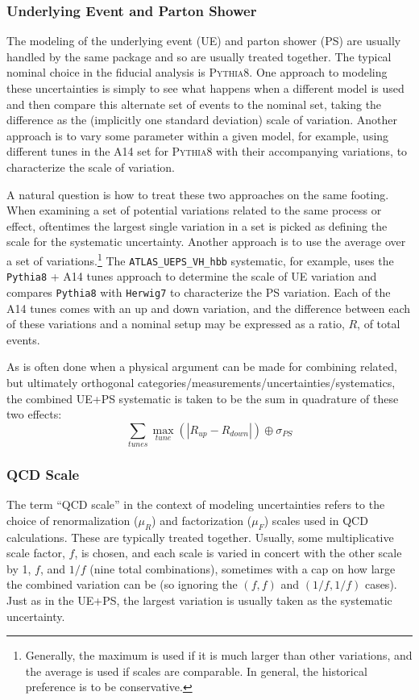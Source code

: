 \subsubsection{Underlying Event and Parton Shower}
\label{sec:ueps}
The modeling of the underlying event (UE) and parton shower (PS) are usually handled by the same package and so are usually treated together.  The typical nominal choice in the fiducial analysis is \textsc{Pythia8}.  One approach to modeling these uncertainties is simply to see what happens when a different model is used and then compare this alternate set of events to the nominal set, taking the difference as the (implicitly one standard deviation) scale of variation.  Another approach is to vary some parameter within a given model, for example, using different tunes in the A14 set for \textsc{Pythia8} with their accompanying variations, to characterize the scale of variation.  

A natural question is how to treat these two approaches on the same footing.  When examining a set of potential variations related to the same process or effect, oftentimes the largest single variation in a set is picked as defining the scale for the systematic uncertainty.  Another approach is to use the average over a set of variations.\footnote{Generally, the maximum is used if it is much larger than other variations, and the average is used if scales are comparable.  In general, the historical preference is to be conservative.}  The \texttt{ATLAS\_UEPS\_VH\_hbb} systematic, for example, uses the \texttt{Pythia8} + A14 tunes approach to determine the scale of UE variation and compares \texttt{Pythia8} with \texttt{Herwig7} to characterize the PS variation.  Each of the A14 tunes comes with an up and down variation, and the difference between each of these variations and a nominal setup may be expressed as a ratio, $R$, of total events.  

As is often done when a physical argument can be made for combining related, but ultimately orthogonal categories/measurements/uncertainties/systematics, the combined UE+PS systematic is taken to be the sum in quadrature of these two effects:
\begin{equation}
\sum_{tunes}\max_{tune}\left(\left|R_{up}-R_{down}\right|\right)\oplus\sigma_{PS}
\label{eqn:uepsvhhbb}
\end{equation}

\subsubsection{QCD Scale}
The term ``QCD scale'' in the context of modeling uncertainties refers to the choice of renormalization ($\mu_R$) and factorization ($\mu_F$) scales used in QCD calculations.  These are typically treated together.  Usually, some multiplicative scale factor, $f$, is chosen, and each scale is varied in concert with the other scale by 1, $f$, and $1/f$ (nine total combinations), sometimes with a cap on how large the combined variation can be (so ignoring the $\left(f,f\right)$ and $\left(1/f,1/f\right)$ cases).  Just as in the UE+PS, the largest variation is usually taken as the systematic uncertainty.

